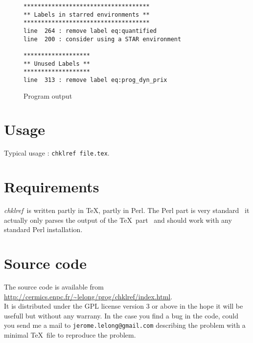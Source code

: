 \documentclass[a4paper,11pt,twoside]{article}
\def\chk{{\it chklref}}
\def\endpage{}%
\def\endpage{\HCode{</div>}}%
\begin{document}
\begin{figure}[htbp]
  \centering
\begin{verbatim}
************************************
** Labels in starred environments **
************************************
line  264 : remove label eq:quantified
line  200 : consider using a STAR environment

*******************
** Unused Labels **
*******************
line  313 : remove label eq:prog_dyn_prix
\end{verbatim}
  \caption{Program output}
  \label{fig:output}
\end{figure}


\section{Usage}

Typical usage : \verb!chklref file.tex!.
\\


\section{Requirements}

\chk\ is written partly in \TeX, partly in Perl. The Perl part is very
standard \textemdash\ it actually only parses the output of the \TeX\ part
\textemdash\ and should work with any standard Perl installation.


\section{Source code}

The source code is available from
\url{http://cermics.enpc.fr/~lelong/prog/chklref/index.html}.
\\

\noindent It is distributed under the GPL license version 3 or above in the
hope it will be usefull but without any warrany. In the case you find a bug in
the code, could you send me a mail to \verb!jerome.lelong@gmail.com! describing
the problem with a minimal \TeX\ file to reproduce the problem.

\endpage
\end{document}
